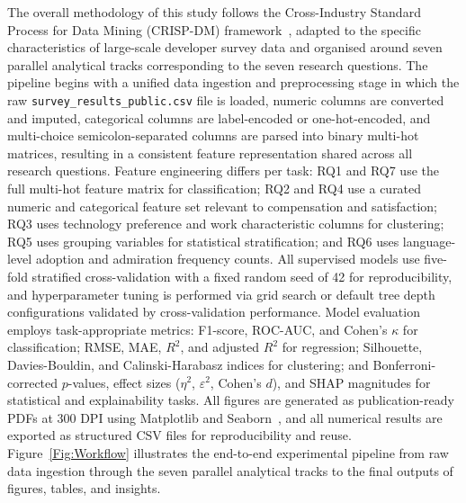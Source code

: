 \documentclass[journal, onecolumn]{IEEEtran}
\begin{document}
The overall methodology of this study follows the Cross-Industry Standard Process for Data Mining (CRISP-DM) framework~\cite{wirth2000crisp}, adapted to the specific characteristics of large-scale developer survey data and organised around seven parallel analytical tracks corresponding to the seven research questions.
The pipeline begins with a unified data ingestion and preprocessing stage in which the raw \texttt{survey\_results\_public.csv} file is loaded, numeric columns are converted and imputed, categorical columns are label-encoded or one-hot-encoded, and multi-choice semicolon-separated columns are parsed into binary multi-hot matrices, resulting in a consistent feature representation shared across all research questions.
Feature engineering differs per task: RQ1 and RQ7 use the full multi-hot feature matrix for classification; RQ2 and RQ4 use a curated numeric and categorical feature set relevant to compensation and satisfaction; RQ3 uses technology preference and work characteristic columns for clustering; RQ5 uses grouping variables for statistical stratification; and RQ6 uses language-level adoption and admiration frequency counts.
All supervised models use five-fold stratified cross-validation with a fixed random seed of 42 for reproducibility, and hyperparameter tuning is performed via grid search or default tree depth configurations validated by cross-validation performance.
Model evaluation employs task-appropriate metrics: F1-score, ROC-AUC, and Cohen's $\kappa$ for classification; RMSE, MAE, $R^2$, and adjusted $R^2$ for regression; Silhouette, Davies-Bouldin, and Calinski-Harabasz indices for clustering; and Bonferroni-corrected $p$-values, effect sizes ($\eta^2$, $\varepsilon^2$, Cohen's $d$), and SHAP magnitudes for statistical and explainability tasks.
All figures are generated as publication-ready PDFs at 300 DPI using Matplotlib and Seaborn~\cite{pedregosa2011scikit}, and all numerical results are exported as structured CSV files for reproducibility and reuse.
Figure~\ref{Fig:Workflow} illustrates the end-to-end experimental pipeline from raw data ingestion through the seven parallel analytical tracks to the final outputs of figures, tables, and insights.
\end{document}
